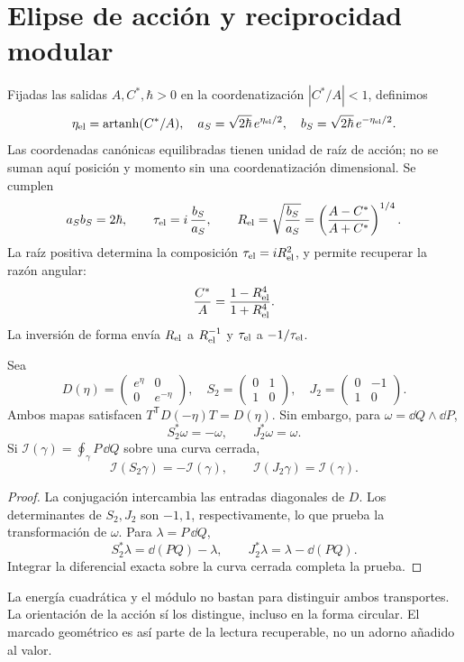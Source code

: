 \section{Elipse de acción y reciprocidad modular}
\label{sec:ellipse}
Fijadas las salidas $A,C^*,\hbar>0$ en la coordenatización
$|C^*/A|<1$, definimos
\[
\eta_{\rm el}=\operatorname{artanh}(C^*/A),\quad
a_S=\sqrt{2\hbar}\,e^{\eta_{\rm el}/2},\quad
b_S=\sqrt{2\hbar}\,e^{-\eta_{\rm el}/2}.
\]
Las coordenadas canónicas equilibradas tienen unidad de raíz de acción;
no se suman aquí posición y momento sin una coordenatización dimensional.
Se cumplen
\[
a_Sb_S=2\hbar,\qquad
\tau_{\rm el}=i\,\frac{b_S}{a_S},\qquad
R_{\rm el}=\sqrt{\frac{b_S}{a_S}}
=\left(\frac{A-C^*}{A+C^*}\right)^{1/4}.
\]
La raíz positiva determina la composición $\tau_{\rm el}=iR_{\rm el}^2$,
y permite recuperar la razón angular:
\[
\frac{C^*}{A}=\frac{1-R_{\rm el}^4}{1+R_{\rm el}^4}.
\]
La inversión de forma envía $R_{\rm el}$ a $R_{\rm el}^{-1}$ y
$\tau_{\rm el}$ a $-1/\tau_{\rm el}$.

\begin{proposition}
Sea
\[
D(\eta)=\begin{pmatrix}e^\eta&0\\0&e^{-\eta}\end{pmatrix},
\quad
S_2=\begin{pmatrix}0&1\\1&0\end{pmatrix},
\quad
J_2=\begin{pmatrix}0&-1\\1&0\end{pmatrix}.
\]
Ambos mapas satisfacen $T^{\mathsf T}D(-\eta)T=D(\eta)$.
Sin embargo, para $\omega=\dd Q\wedge\dd P$,
\[
S_2^*\omega=-\omega,\qquad J_2^*\omega=\omega.
\]
Si $\mathcal I(\gamma)=\oint_\gamma P\,\dd Q$ sobre una curva cerrada,
\[
\mathcal I(S_2\gamma)=-\mathcal I(\gamma),\qquad
\mathcal I(J_2\gamma)=\mathcal I(\gamma).
\]
\end{proposition}
\begin{proof}
La conjugación intercambia las entradas diagonales de $D$.
Los determinantes de $S_2,J_2$ son $-1,1$, respectivamente, lo que
prueba la transformación de $\omega$. Para $\lambda=P\,\dd Q$,
\[
S_2^*\lambda=\dd(PQ)-\lambda,\qquad
J_2^*\lambda=\lambda-\dd(PQ).
\]
Integrar la diferencial exacta sobre la curva cerrada completa la prueba.
\end{proof}

La energía cuadrática y el módulo no bastan para distinguir ambos
transportes. La orientación de la acción sí los distingue, incluso
en la forma circular. El marcado geométrico es así parte de la lectura
recuperable, no un adorno añadido al valor.
